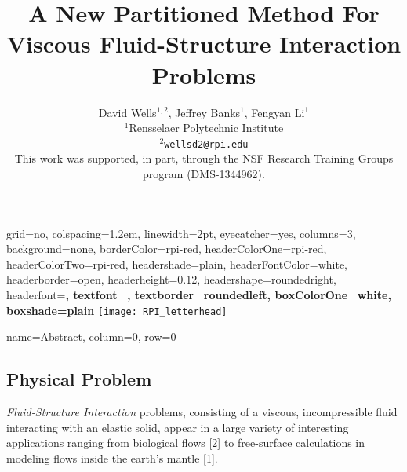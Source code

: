 \documentclass[
paperwidth=48in,paperheight=36in,
fontscale=0.4
]{baposter}
\title{A New Partitioned Method For Viscous Fluid-Structure Interaction Problems}
\author{ David Wells$^{1,2}$, Jeffrey Banks$^1$, Fengyan Li$^1$               \\
 \vspace{.1in}
 $^1$Rensselaer Polytechnic Institute                                         \\
 \texttt{\small $^2$wellsd2@rpi.edu}                                          \\
 \footnotesize{This work was supported, in part, through the NSF Research Training Groups program (DMS-1344962).}
}
\begin{document}
\begin{poster}{
 grid=no,           %
 colspacing=1.2em,  %
 linewidth=2pt,
 eyecatcher=yes,     %
 columns=3,         %
 background=none,   %
 borderColor=rpi-red, %
 headerColorOne=rpi-red,
 headerColorTwo=rpi-red,
 headershade=plain,
 headerFontColor=white,
 headerborder=open,
 headerheight=0.12\textheight,
 headershape=roundedright,
 headerfont=\Large\sffamily\bfseries,
 textfont=\sffamily,
 textborder=roundedleft,
 boxColorOne=white,
 boxshade=plain
}
{ }
{\sffamily\Huge\thetitle\vspace{-0.2em}}
{\sffamily\theauthor}
{
  \texttt{[image: RPI\_letterhead]} \hspace{1.1in}
}

\newcommand*{\vcenterarrow}{\vcenter{\hbox{$\Longrightarrow$}}}
\newcommand*{\vcenterimage}[1]{\vcenter{\hbox{\texttt{[image: \#1]}}}}
\newcommand{\leftd}[1]{{\color{red} \bar{#1}}}
\newcommand{\interface}[2]{{\color{blue}{#1}_I(#2)}}
\newcommand{\leftdd}[2]{{\color{red} \bar{#1}(\bar{#2})}}
\newcommand{\leftFourier}[1]{{\color{red} \hat{#1}}}
\newcommand{\leftFourierTwo}[2]{{\color{red} \hat{#1}(\hat{#2})}}
\newcommand{\half}{\dfrac{1}{2}}
\newcommand{\divergence}{\mathrm{div}}

          {name=Abstract, column=0, row=0}
{
\subsection{Physical Problem}
    \emph{Fluid-Structure Interaction} problems, consisting of a viscous,
    incompressible fluid interacting with an elastic solid, appear in a large
    variety of interesting applications ranging from biological flows [2] to
    free-surface calculations in modeling flows inside the earth's mantle [1].

}
\end{poster}
\end{document}
